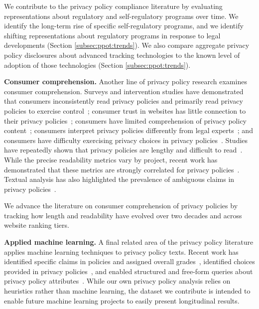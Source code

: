 We contribute to the privacy policy compliance literature by evaluating representations about regulatory and self-regulatory programs over time. We identify the long-term rise of specific self-regulatory programs,
 and we identify shifting representations about regulatory programs in response to legal developments
(Section \ref{subsec:ppot:trends}). We also compare aggregate privacy policy disclosures about advanced tracking technologies to the known level of adoption of those technologies (Section \ref{subsec:ppot:trends}).

\textbf{Consumer comprehension.}
Another line of privacy policy research examines consumer comprehension. Surveys and intervention studies have demonstrated that consumers inconsistently read privacy policies and primarily read privacy policies to exercise control~\cite{milne2004}; consumer trust in websites has little connection to their privacy policies~\cite{pan2006}; consumers have limited comprehension of privacy policy content~\cite{vail2008, mcdonald2009comparative}; consumers interpret privacy policies differently from legal experts~\cite{reidenberg2016disagreeable, strahilevitz2016}; and consumers have difficulty exercising privacy choices in privacy policies~\cite{habib2020}. Studies have repeatedly shown that privacy policies are lengthy and difficult to read~\cite{jensen2004, mcdonald2008cost, li2012online, fabian2017large}. While the precise readability metrics vary by project, recent work has demonstrated that these metrics are strongly correlated for privacy policies~\cite{fabian2017large}. Textual analysis has also highlighted the prevalence of ambiguous claims in privacy policies~\cite{reidenberg2016ambiguity}.

We advance the literature on consumer comprehension of privacy policies by tracking how length and readability have evolved over two decades and across website ranking tiers.

\textbf{Applied machine learning.}
A final related area of the privacy policy literature applies machine learning techniques to 
privacy policy texts. Recent work has identified specific claims in policies and assigned overall grades~\cite{zimmeck2014}, identified choices provided in privacy policies~\cite{sathyendra2017, kumar2020}, and enabled structured and free-form queries about privacy policy attributes~\cite{harkous2018polisis}. While our own privacy policy analysis relies on heuristics rather than  machine learning, the dataset we contribute is intended to enable future machine learning projects to easily present longitudinal results.